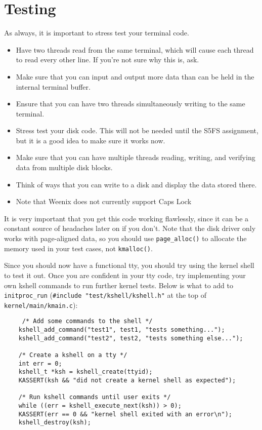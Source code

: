 \section{Testing}
As always, it is important to stress test your terminal code.
\begin{itemize}
    \item Have two threads read from the same terminal, which will cause each thread to read every other line. If you're not sure why this is, ask.
    \item Make sure that you can input and output more data than can be held in the internal terminal buffer.
    \item Ensure that you can have two threads simultaneously writing to the same terminal.
    \item Stress test your disk code. This will not be needed until the S5FS assignment, but it is a good idea to make sure it works now.
    \item Make sure that you can have multiple threads reading, writing, and verifying data from multiple disk blocks.
    \item Think of ways that you can write to a disk and display the data stored there.
    \item Note that Weenix does not currently support Caps Lock
\end{itemize}
 It is very important that you get this code working flawlessly, since it can be a constant source of headaches later on if you don't. Note that the disk driver only works with page-aligned data, so you should use \texttt{page\_alloc()} to allocate the memory used in your test cases, not \texttt{kmalloc()}.

Since you should now have a functional tty, you should try using the kernel shell to test it out. Once you are confident in your tty code, try implementing your own kshell commands to run further kernel tests. Below is what to add to \texttt{initproc\_run} (\texttt{\#include "test/kshell/kshell.h"} at the top of \texttt{kernel/main/kmain.c}):
\begin{verbatim}
     /* Add some commands to the shell */
    kshell_add_command("test1", test1, "tests something...");
    kshell_add_command("test2", test2, "tests something else...");
 
    /* Create a kshell on a tty */
    int err = 0;
    kshell_t *ksh = kshell_create(ttyid);
    KASSERT(ksh && "did not create a kernel shell as expected");
 
    /* Run kshell commands until user exits */
    while ((err = kshell_execute_next(ksh)) > 0);
    KASSERT(err == 0 && "kernel shell exited with an error\n");
    kshell_destroy(ksh);
\end{verbatim}
